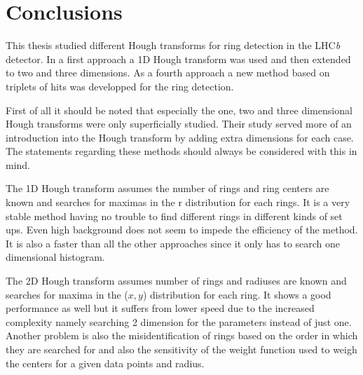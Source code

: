 \documentclass[11pt]{scrreprt}
\begin{document}

\chapter{Conclusions} %
\label{cha:conclusions}

This thesis studied different Hough transforms for ring detection in the LHC\textit{b} detector. In a first approach a 1D Hough 
transform was used and then extended to two and three dimensions.
As a fourth approach a new method based on triplets of hits was developped for the ring detection. 

First of all it should be noted that especially the one, two and three dimensional Hough transforms were only superficially studied. Their study served more of an introduction into the Hough transform by adding extra dimensions for each case. The statements regarding these methods should always be considered with this in mind.

The 1D Hough transform assumes the number of rings and ring centers are known and searches for maximas in the r distribution for each rings.
It is a very stable method having no trouble to find different rings in different kinds of set ups. Even high background does not seem to impede the efficiency of the method. It is also a faster than all the other approaches since it only has to search one dimensional histogram.

The 2D Hough transform assumes number of rings and radiuses are known and searches for maxima in the ($x,y$) distribution for each ring. It shows a good performance as well but it suffers from lower speed due to the increased complexity namely searching
2 dimension for the parameters instead of just one. Another problem is also the misidentification of rings based on the order in which
they are searched for and also the sensitivity of the weight function used to weigh the centers for a given data points and radius.
\end{document}

